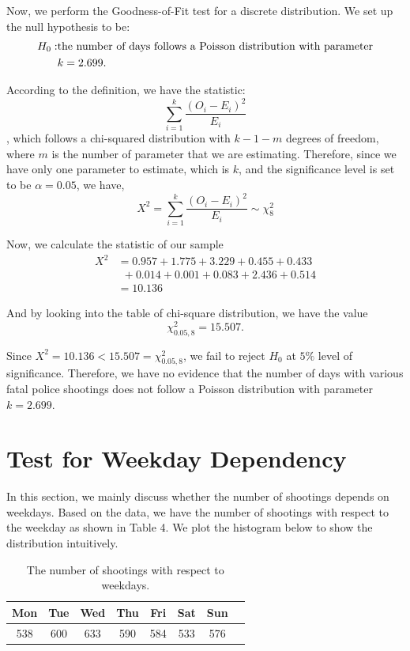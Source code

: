 \documentclass[a4paper]{article}
\begin{document}
{{Now, we perform the Goodness-of-Fit test for a discrete distribution. We set up the null hypothesis to be:
    \begin{align*}
    \centering
    H_0: & \textrm{the number of days follows a Poisson distribution with parameter}
    \\& \textrm{$k = 2.699$.}
    \end{align*}

According to the definition, we have the statistic:
\begin{equation}
    \sum_{i=1}^{k} \frac{(O_i-E_i)^2}{E_i}
\end{equation}
, which follows a chi-squared distribution with $k - 1 - m$ degrees of freedom, where $m$ is the number of parameter that we are estimating. Therefore, since we have only one parameter to estimate, which is $k$, and the significance level is set to be $\alpha = 0.05$, we have,
\[X^2 = \sum_{i=1}^{k} \frac{(O_i-E_i)^2}{E_i} \sim \chi_{8}^2\]

Now, we calculate the statistic of our sample
\begin{align*}
    X^2 &= 0.957+1.775+3.229+0.455+0.433\\
    &\ \ +0.014+0.001+0.083+2.436+0.514 \\
           &= 10.136
\end{align*}
\par{And by looking into the table of chi-square distribution, we have the value}
\[\chi_{0.05,8}^2 = 15.507.\]
\par{Since $X^2 = 10.136 < 15.507 = \chi_{0.05,8}^2$, we fail to reject $H_0$ at $5\%$ level of significance. Therefore, we have no evidence that the number of days with various fatal police shootings does not follow a Poisson distribution with parameter $k = 2.699$.}

\newpage
\section{Test for Weekday Dependency}%
In this section, we mainly discuss whether the number of shootings depends on weekdays. Based on the data, we have the number of shootings with respect to the weekday as shown in Table 4. We plot the histogram below to show the distribution intuitively.

\begin{table}[h]
\centering
    \begin{tabular}{cccccccc}
         \hline
         Mon & Tue & Wed & Thu & Fri & Sat & Sun \\
         \hline
         \hline
         538 & 600 & 633 & 590 & 584 & 533 & 576\\
         \hline
    \end{tabular}\\
    \caption{The number of shootings with respect to weekdays.}
\end{table}

}}
\end{document}
